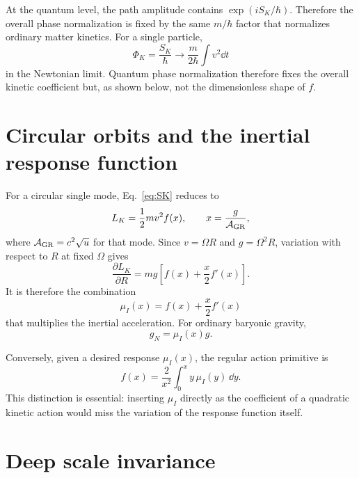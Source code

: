 \documentclass[11pt]{article}
\begin{document}
At the quantum level, the path amplitude contains $\exp(iS_K/\hbar)$. Therefore the overall phase normalization is fixed by the same $m/\hbar$ factor that normalizes ordinary matter kinetics. For a single particle,
\begin{equation}
    \Phi_K=\frac{S_K}{\hbar}
    \longrightarrow
    \frac{m}{2\hbar}\int v^2\dd t
\end{equation}
in the Newtonian limit. Quantum phase normalization therefore fixes the overall kinetic coefficient but, as shown below, not the dimensionless shape of $f$.

\section{Circular orbits and the inertial response function}

For a circular single mode, Eq.~\eqref{eq:SK} reduces to
\begin{equation}
    L_K=\frac12 m v^2 f(x),
    \qquad
    x=\frac{g}{\mathcal A_{\rm GR}},
    \label{eq:Lcirc}
\end{equation}
where $\mathcal A_{\rm GR}=c^2\sqrt u$ for that mode. Since $v=\Omega R$ and $g=\Omega^2R$, variation with respect to $R$ at fixed $\Omega$ gives
\begin{equation}
    \frac{\partial L_K}{\partial R}
    =mg\left[f(x)+\frac{x}{2}f'(x)\right].
\end{equation}
It is therefore the combination
\begin{equation}
    \boxed{
    \mu_I(x)=f(x)+\frac{x}{2}f'(x)
    }
    \label{eq:muI}
\end{equation}
that multiplies the inertial acceleration. For ordinary baryonic gravity,
\begin{equation}
    \boxed{g_N=\mu_I(x)g.}
    \label{eq:circeom}
\end{equation}

Conversely, given a desired response $\mu_I(x)$, the regular action primitive is
\begin{equation}
    f(x)=\frac{2}{x^2}\int_0^x y\,\mu_I(y)\,\dd y.
    \label{eq:primitive}
\end{equation}
This distinction is essential: inserting $\mu_I$ directly as the coefficient of a quadratic kinetic action would miss the variation of the response function itself.

\section{Deep scale invariance}
\end{document}
